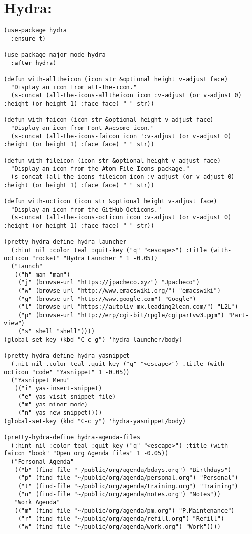 \documentclass[11pt]{article}
\begin{document}
\section{Hydra:}
\label{sec:orgd5d070d}
\begin{verbatim}
(use-package hydra
  :ensure t)

(use-package major-mode-hydra
  :after hydra)

(defun with-alltheicon (icon str &optional height v-adjust face)
  "Display an icon from all-the-icon."
  (s-concat (all-the-icons-alltheicon icon :v-adjust (or v-adjust 0) :height (or height 1) :face face) " " str))

(defun with-faicon (icon str &optional height v-adjust face)
  "Display an icon from Font Awesome icon."
  (s-concat (all-the-icons-faicon icon ':v-adjust (or v-adjust 0) :height (or height 1) :face face) " " str))

(defun with-fileicon (icon str &optional height v-adjust face)
  "Display an icon from the Atom File Icons package."
  (s-concat (all-the-icons-fileicon icon :v-adjust (or v-adjust 0) :height (or height 1) :face face) " " str))

(defun with-octicon (icon str &optional height v-adjust face)
  "Display an icon from the GitHub Octicons."
  (s-concat (all-the-icons-octicon icon :v-adjust (or v-adjust 0) :height (or height 1) :face face) " " str))

(pretty-hydra-define hydra-launcher
  (:hint nil :color teal :quit-key ("q" "<escape>") :title (with-octicon "rocket" "Hydra Launcher " 1 -0.05))
  ("Launch"
   (("h" man "man")
    ("j" (browse-url "https://jpacheco.xyz") "Jpacheco")
    ("w" (browse-url "http://www.emacswiki.org/") "emacswiki")
    ("g" (browse-url "http://www.google.com") "Google")
    ("l" (browse-url "https://autoliv-mx.leading2lean.com/") "L2L")
    ("p" (browse-url "http://erp/cgi-bit/rpgle/cgipartvw3.pgm") "Part-view")
    ("s" shell "shell"))))
(global-set-key (kbd "C-c g") 'hydra-launcher/body)

(pretty-hydra-define hydra-yasnippet 
  (:nit nil :color teal :quit-key ("q" "<escape>") :title (with-octicon "code" "Yasnippet" 1 -0.05))
  ("Yasnippet Menu"
   (("i" yas-insert-snippet)
    ("e" yas-visit-snippet-file)
    ("m" yas-minor-mode)
    ("n" yas-new-snippet))))
(global-set-key (kbd "C-c y") 'hydra-yasnippet/body)

(pretty-hydra-define hydra-agenda-files
  (:hint nil :color teal :quit-key ("q" "<escape>") :title (with-faicon "book" "Open org Agenda files" 1 -0.05))
  ("Personal Agenda"
   (("b" (find-file "~/public/org/agenda/bdays.org") "Birthdays")
    ("p" (find-file "~/public/org/agenda/personal.org") "Personal")
    ("t" (find-file "~/public/org/agenda/training.org") "Training")
    ("n" (find-file "~/public/org/agenda/notes.org") "Notes"))
   "Work Agenda"
   (("m" (find-file "~/public/org/agenda/pm.org") "P.Maintenance")
    ("r" (find-file "~/public/org/agenda/refill.org") "Refill")
    ("w" (find-file "~/public/org/agenda/work.org") "Work"))))


\end{verbatim}
\end{document}
